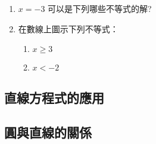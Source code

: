 \documentclass[bwprint,a4paper]{extarticle}
\begin{document}
\vspace{35ex}
\begin{observing}
	\begin{enumerate}
		\item $x=-3$ 可以是下列哪些不等式的解?\\[8pt]
		\item 在數線上圖示下列不等式：
		\begin{enumerate}[label=(\arabic*)]
			\item $x\geq3$
			\item $x<-2$
		\end{enumerate}			
	\end{enumerate}
\end{observing}


\subsection{直線方程式的應用}

\subsection{圓與直線的關係}
\end{document}
